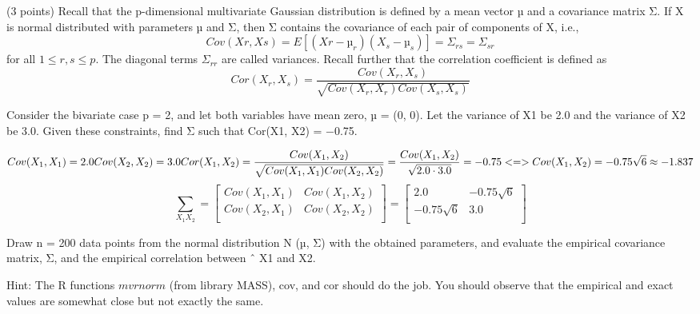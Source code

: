 \documentclass[]{article}
\title{}
\author{}
\date{}
\begin{document}
(3 points) Recall that the p-dimensional multivariate Gaussian
distribution is defined by a mean vector µ and a covariance matrix Σ. If
X is normal distributed with parameters µ and Σ, then Σ contains the
covariance of each pair of components of X, i.e., \[
Cov(Xr, Xs) = E[(Xr − µ_r)(X_s − µ_s)] = Σ_{rs} = Σ_{sr}
\] for all \(1 ≤ r, s ≤ p\). The diagonal terms \(Σ_{rr}\) are called
variances. Recall further that the correlation coefficient is defined as
\[
Cor(X_r, X_s) = \frac{Cov(X_r, X_s)}{\sqrt{Cov(X_r, X_r) Cov(X_s, X_s)}}
\]

Consider the bivariate case p = 2, and let both variables have mean
zero, µ = (0, 0). Let the variance of X1 be 2.0 and the variance of X2
be 3.0. Given these constraints, find Σ such that Cor(X1, X2) = −0.75.

\[
Cov(X_1, X_1) = 2.0\\ 
Cov(X_2, X_2) = 3.0\\
Cor(X_1, X_2) = \frac{Cov(X_1, X_2)}{\sqrt{Cov(X_1, X_1) Cov(X_2, X_2)}}=\frac{Cov(X_1,X_2)}{\sqrt{2.0\cdot3.0}}=-0.75\\
<=>\\
Cov(X_1, X_2) = -0.75\sqrt{6}\approx-1.837\\
\] \[
\sum_{X_1X_2}=\begin{bmatrix}
    Cov(X_1, X_1) & Cov(X_1, X_2)\\
    Cov(X_2, X_1) & Cov(X_2, X_2)\\
\end{bmatrix}
=\begin{bmatrix}
    2.0 & -0.75\sqrt{6}\\
    -0.75\sqrt{6} & 3.0\\
\end{bmatrix}
\]

Draw n = 200 data points from the normal distribution N (µ, Σ) with the
obtained parameters, and evaluate the empirical covariance matrix, Σ,
and the empirical correlation between ˆ X1 and X2.

Hint: The R functions \(mvrnorm\) (from library MASS), cov, and cor
should do the job. You should observe that the empirical and exact
values are somewhat close but not exactly the same.
\end{document}
